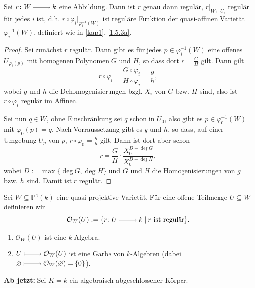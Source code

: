 \documentclass[a4paper,12pt]{scrbook}
\newtheorem{proof}{Beweis}
\def\O{\mathcal{O}}
\def\P{\mathbb{P}}
\newcommand{\leer}{\ensuremath{\varnothing}}
\newcommand{\restrict}[1]{|_{#1}}
\newcommand{\ra}{\raisebox{-1pt}{\tikz{\draw[thin,shorten >=3pt, ->] (0,0) node{\hspace*{-2pt}} -- node{} (1,0);}}\penalty1000\relax}
\renewcommand{\mapsto}{\raisebox{-1pt}{\tikz{\draw[thin,shorten >=3pt, |->] (0,0) node{\hspace*{0pt}} -- node{} (1,0);}}\penalty1000\relax}
\begin{document}
\begin{bem}\label{2.5.2}
Sei $r\colon W\ra k$ eine Abbildung. Dann ist $r$ genau dann regulär, $r\restrict{W\cap U_{i}}$ regulär für jedes $i$ ist, d.h. $r\circ\varphi_{i}\restrict{\varphi_{i}^{-1}(W)}$ ist reguläre Funktion der quasi-affinen Varietät $\varphi_{i}^{-1}(W)$, definiert wie in \cref{kap1}, \cref{1.5.3a}.
\end{bem}
\begin{proof} Sei zunächst $r$ regulär. Dann gibt es für jedes $p\in\varphi_{i}^{-1}(W)$ eine offenes $U_{\varphi_{i}(p)}$ mit homogenen Polynomen $G$ und $H$, so dass dort $r=\frac{G}{H}$ gilt. Dann gilt
\[r\circ\varphi_{i}=\frac{G\circ\varphi_{i}}{H\circ\varphi_{i}}=\frac{g}{h},\]
wobei $g$ und $h$ die Dehomogenisierungen bzgl. $X_{i}$ von $G$ bzw. $H$ sind, also ist $r\circ\varphi_{i}$ regulär im Affinen.

Sei nun $q\in W$, ohne Einschränkung sei $q$ schon in $U_{0}$, also gibt es $p\in\varphi_{0}^{-1}(W)$ mit $\varphi_{0}(p)=q$. Nach Vorraussetzung gibt es $g$ und $h$, so dass, auf einer Umgebung $U_{p}$ von $p$, $r\circ\varphi_{0}=\frac{g}{h}$ gilt. Dann ist dort aber schon
\[r=\frac{G}{H}\cdot\frac{X_{0}^{D-\deg G}}{X_{0}^{D-\deg H}},\]
wobei $D:=\max\{\deg G,\deg H\}$ und $G$ und $H$ die Homogenisierungen von $g$ bzw. $h$ sind. Damit ist $r$ regulär.
\end{proof}

\begin{db}\label{2.5.3}
Sei $W\subseteq\P^{n}(k)$ eine quasi-projektive Varietät. Für eine offene Teilmenge $U\subseteq W$ definieren wir 
\[\O_{W}(U):=\{r\colon U\ra k\mid r\text{ ist regulär}\}.\]
\begin{enumerate}
\item $\O_{W}(U)$ ist eine $k$-Algebra.
\item $U\mapsto\O_{W}(U)$ ist eine Garbe von $k$-Algebren (dabei: $\leer\mapsto\O_{W}(\leer)=\{0\}$).
\end{enumerate}\end{db}

\begin{w}
{\bf Ab jetzt:} Sei $K=k$ ein algebraisch abgeschlossener Körper.
\end{w}
\end{document}
